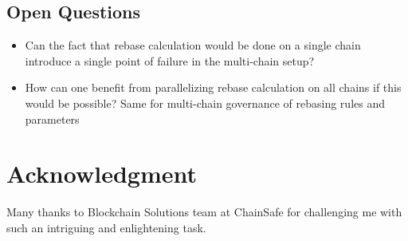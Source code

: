 \documentclass{article}
\begin{document}
\subsection{Open Questions}

\begin{itemize}
	\item Can the fact that rebase calculation would be done on a single chain introduce a single point of failure in the multi-chain setup?
	\item How can one benefit from parallelizing rebase calculation on all chains if this would be possible? Same for multi-chain governance of rebasing rules and parameters
\end{itemize}

\section{Acknowledgment}

Many thanks to Blockchain Solutions team at ChainSafe for challenging me with such an intriguing and enlightening task.



\end{document}
